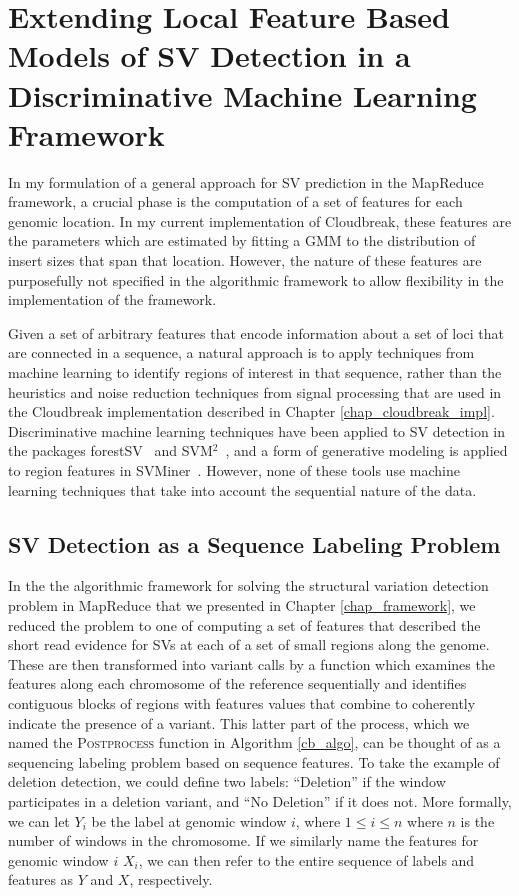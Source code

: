 \chapter{Extending Local Feature Based Models of SV Detection in a Discriminative Machine Learning Framework}\label{chap_crf}

In my formulation of a general approach for SV prediction in the MapReduce framework, a crucial phase is the computation of a set of features for each genomic location. In my current implementation of Cloudbreak, these features are the parameters which are estimated by fitting a GMM to the distribution of insert sizes that span that location. However, the nature of these features are purposefully not specified in the algorithmic framework to allow flexibility in the implementation of the framework.

Given a set of arbitrary features that encode information about a set of loci that are connected in a sequence, a natural approach is to apply techniques from machine learning to identify regions of interest in that sequence, rather than the heuristics and noise reduction techniques from signal processing that are used in the Cloudbreak implementation described in Chapter \ref{chap_cloudbreak_impl}. Discriminative machine learning techniques have been applied to SV detection in the packages forestSV~\cite{Michaelson:2012fj} and SVM$^2$~\cite{Chiara:2012ey}, and a form of generative modeling is applied to region features in SVMiner~\cite{Hayes:2012ia}. However, none of these tools use machine learning techniques that take into account the sequential nature of the data. 

\section{SV Detection as a Sequence Labeling Problem}

In the the algorithmic framework for solving the structural variation detection problem in MapReduce that we presented in Chapter \ref{chap_framework}, we reduced the problem to one of computing a set of features that described the short read evidence for SVs at each of a set of small regions along the genome. These are then transformed into variant calls by a function which examines the features along each chromosome of the reference sequentially and identifies contiguous blocks of regions with features values that combine to coherently indicate the presence of a variant. This latter part of the process, which we named the \textsc{Postprocess} function in Algorithm \ref{cb_algo}, can be thought of as a sequencing labeling problem based on sequence features. To take the example of deletion detection, we could define two labels: ``Deletion'' if the window participates in a deletion variant, and ``No Deletion'' if it does not. More formally, we can let $Y_i$ be the label at genomic window $i$, where $1 \le i \le n$ where $n$ is the number of windows in the chromosome. If we similarly name the features for genomic window $i$ $X_i$, we can then refer to the entire sequence of labels and features as $Y$ and $X$, respectively.

